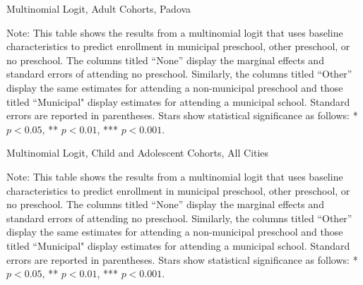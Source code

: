 \begin{table}[H]
\centering
\caption{Multinomial Logit, Adult Cohorts, Padova} \label{mlogit-adult-PD}
\begin{threeparttable}

\begin{tablenotes}
\footnotesize\raggedright{Note: This table shows the results from a multinomial logit that uses baseline characteristics to predict enrollment in municipal preschool, other preschool, or no preschool. The columns titled ``None'' display the marginal effects and standard errors of attending no preschool. Similarly, the columns titled ``Other'' display the same estimates for attending a non-municipal preschool and those titled ``Municipal" display estimates for attending a municipal school. Standard errors are reported in parentheses. Stars show statistical significance as follows: * $p < 0.05$, ** $p < 0.01$, *** $p < 0.001$.}
\end{tablenotes}
\end{threeparttable}
\end{table}

\begin{table}[H]
\centering
\caption{Multinomial Logit, Child and Adolescent Cohorts,  All Cities} \label{mlogit_all_chi-ado}
\begin{threeparttable}

\begin{tablenotes}
\footnotesize\raggedright{Note: This table shows the results from a multinomial logit that uses baseline characteristics to predict enrollment in municipal preschool, other preschool, or no preschool. The columns titled ``None'' display the marginal effects and standard errors of attending no preschool. Similarly, the columns titled ``Other'' display the same estimates for attending a non-municipal preschool and those titled ``Municipal" display estimates for attending a municipal school. Standard errors are reported in parentheses. Stars show statistical significance as follows: * $p < 0.05$, ** $p < 0.01$, *** $p < 0.001$.}
\end{tablenotes}
\end{threeparttable}
\end{table}


